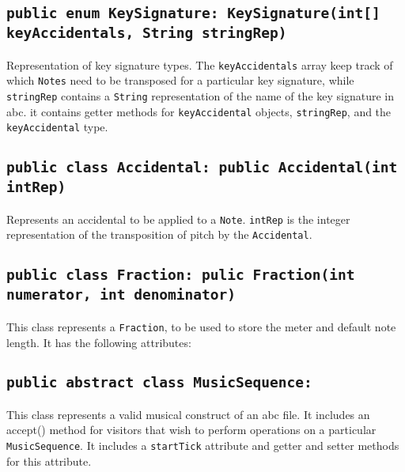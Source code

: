 \documentclass{article}
\begin{document}
\subsection*{ {\tt public enum KeySignature: KeySignature(int[] keyAccidentals, String stringRep)}}
Representation of key signature types. The {\tt keyAccidentals} array keep track of which {\tt Notes} need to be transposed for a particular key signature, while {\tt stringRep} contains a {\tt String} representation of the name of the key signature in abc. it contains getter methods for {\tt keyAccidental} objects, {\tt stringRep}, and the {\tt keyAccidental} type.
\subsection*{{\tt public class Accidental: public Accidental(int intRep)}}
Represents an accidental to be applied to a {\tt Note}. {\tt intRep} is the integer representation of the transposition of pitch by the {\tt Accidental}.
\subsection*{{\tt public class Fraction: pulic Fraction(int numerator, int denominator)}}
This class represents a {\tt Fraction}, to be used to store the meter and default note length. It has the following attributes:
\subsection*{{\tt public abstract class MusicSequence:}}
This class represents a valid musical construct of an abc file. It includes an accept() method for visitors that wish to perform operations on a particular {\tt MusicSequence}. It includes a {\tt startTick} attribute and getter and setter methods for this attribute.
\end{document}

